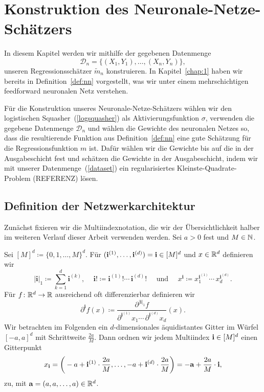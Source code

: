 \chapter{Konstruktion des Neuronale-Netze-Schätzers}
\label{chap:2}

In diesem Kapitel werden wir mithilfe der gegebenen Datenmenge 
\begin{equation}
\label{dataset}
\mathcal{D}_n = \{(X_1, Y_1),\dots,(X_n, Y_n)\},
\end{equation}
unseren Regressionsschätzer $\tilde{m}_n$ konstruieren. 
In Kapitel~\ref{chap:1} haben wir bereits in Definition~\ref{def:nn} vorgestellt, was wir unter einem mehrschichtigen feedforward neuronalen Netz verstehen.

Für die Konstruktion unseres Neuronale-Netze-Schätzers wählen wir den logistischen Squasher~(\ref{logsquasher}) als Aktivierungsfunktion $\sigma$, verwenden die gegebene Datenmenge $\mathcal{D}_n$ und wählen die Gewichte des neuronalen Netzes so, dass die resultierende Funktion aus Definition~\ref{def:nn} eine gute Schätzung für die Regressionsfunktion $m$ ist. Dafür wählen wir die Gewichte bis auf die in der Ausgabeschicht fest und schätzen die Gewichte in der Ausgabeschicht, indem wir mit unserer Datenmenge~(\ref{dataset}) ein regularisiertes Kleinste-Quadrate-Problem (REFERENZ) lösen.

\section{Definition der Netzwerkarchitektur}
Zunächst fixieren wir die Multiindexnotation, die wir der Übersichtlichkeit halber im weiteren Verlauf dieser Arbeit verwenden werden. Sei $a > 0$ fest und $M \in \mathbb{N}$. 

Sei $[M]^d \coloneqq\{0, 1, \dots, M\}^d.$ 
Für $(\mathbf{i}^{(1)},\dots,\mathbf{i}^{(d)}) = \mathbf{i} \in [M]^d$ und $x \in \mathbb{R}^d$ definieren wir
$$|\mathbf{i}|_1 \coloneqq \sum_{k= 1}^d \mathbf{i}^{(k)} \text{, } \quad \mathbf{i}! \coloneqq \mathbf{i}^{(1)}! \cdots \, \mathbf{i}^{(d)}! \quad \text{ und } \quad x^{\mathbf{i}} \coloneqq x_1^{\mathbf{i}^{(1)}} \cdots \,    x_d^{\mathbf{i}^{(d)}}.$$
Für $f\colon \mathbb{R}^d \to \mathbb{R}$ ausreichend oft differenzierbar definieren wir 
$$\partial^{\mathbf{i}}f(x) \coloneqq \frac{\partial^{|\mathbf{i}|_1}f}{\partial^{\mathbf{i}^{(1)}} x_1 \cdots \, \partial^{\mathbf{i}^{(d)}} x_d} (x).$$
Wir betrachten im Folgenden ein $d$-dimensionales äquidistantes Gitter im Würfel $[-a, a]^d$ mit Schrittweite $\frac{2a}{M}.$ 
Dann ordnen wir jedem Multiindex $\mathbf{i} \in [M]^d$ einen Gitterpunkt
\begin{equation}
\label{eq:gitter}
x_{\mathbf{i}} = \bigg( -a + \mathbf{i}^{(1)} \cdot \frac{2a}{M},\dots, -a + \mathbf{i}^{(d)} \cdot \frac{2a}{M}\bigg) = -\mathbf{a} + \frac{2a}{M} \cdot \mathbf{i},
\end{equation}
zu, mit $\mathbf{a} = (a, a, \dots, a) \in \mathbb{R}^d$.

